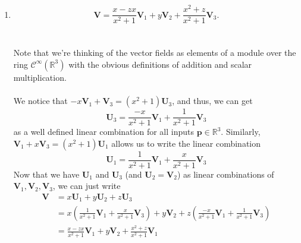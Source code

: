 \documentclass[12 pt, letterpaper]{hmcpset}
\begin{document}
\begin{solution}
\begin{enumerate}
\[\begin{bmatrix}
					a_1 \\
					a_2 \\
					a_3
				\end{bmatrix} = \mathbf 0
			\]
			Since the matrix has determinant $x^2 + 1$, its determinant is non-zero for all $x \in \mathbb R$. Then the matrix is always invertible, the only solution to the equation is $a_1 = a_2 = a_3 = 0$, regardless of $x$. Thus, $\mathbf V_1(\mathbf p), \mathbf V_2(\mathbf p), \mathbf V_3(\mathbf p)$ is a linearly independent list of vectors in $\mathrm T_{\mathbf p} \mathbb R^3$ for all $\mathbf p \in \mathbb R^3$.
		\item
			\[
				\boxed{
					\mathbf V = \frac{x - zx}{x^2 + 1} \mathbf V_1 + y \mathbf V_2 + \frac{x^2 + z}{x^2 + 1} \mathbf V_3.
				}
			\] \\\\
			Note that we're thinking of the vector fields as elements of a module over the ring $\mathcal C^\infty(\mathbb R^3)$ with the obvious definitions of addition and scalar multiplication. \\\\
			We notice that $-x \mathbf V_1 + \mathbf V_3 = (x^2 + 1) \mathbf U_3$, and thus, we can get
			\[
				\mathbf U_3 = \frac{-x}{x^2 + 1} \mathbf V_1 + \frac{1}{x^2 + 1} \mathbf V_3
			\]
			as a well defined linear combination for all inputs $\mathbf p \in \mathbb R^3$. Similarly, $\mathbf V_1 + x \mathbf V_3 = (x^2 + 1) \mathbf U_1$ allows us to write the linear combination
			\[
				\mathbf U_1 = \frac{1}{x^2 + 1} \mathbf V_1 + \frac{x}{x^2 + 1} \mathbf V_3
			\]
			Now that we have $\mathbf U_1$ and $\mathbf U_3$ (and $\mathbf U_2 = \mathbf V_2$) as linear combinations of $\mathbf V_1, \mathbf V_2, \mathbf V_3$, we can just write
			\[
				\begin{split}
					\mathbf V & = x \mathbf U_1 + y \mathbf U_2 + z \mathbf U_3 \\
						  & = x \left ( \frac{1}{x^2 + 1} \mathbf V_1 + \frac{x}{x^2 + 1} \mathbf V_3 \right ) + y \mathbf V_2 + z \left ( \frac{-x}{x^2 + 1} \mathbf V_1 + \frac{1}{x^2 + 1} \mathbf V_3 \right ) \\
						  & = \frac{x - zx}{x^2 + 1} \mathbf V_1 + y \mathbf V_2 + \frac{x^2 + z}{x^2 + 1} \mathbf V_1
				\end{split}
			\]
	\end{enumerate}
\end{solution}

\pagebreak
\end{document}
